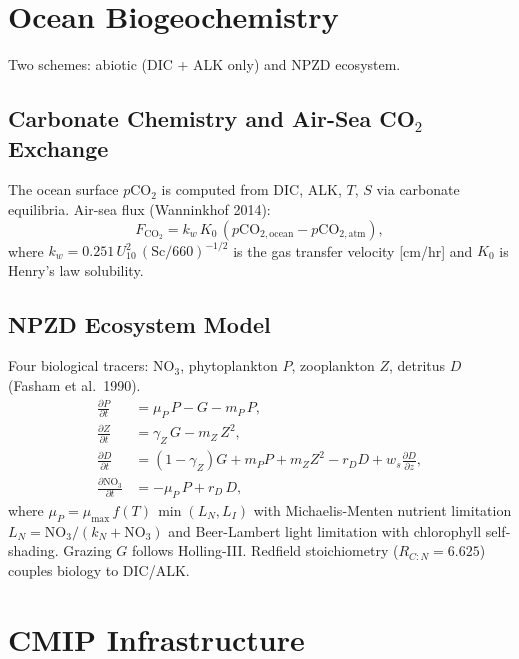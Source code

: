 \documentclass[11pt,a4paper]{article}
\newcommand{\pp}{\partial}
\begin{document}
\section{Ocean Biogeochemistry}

Two schemes: abiotic (DIC + ALK only) and NPZD ecosystem.

\subsection{Carbonate Chemistry and Air-Sea CO$_2$ Exchange}

The ocean surface $p$CO$_2$ is computed from DIC, ALK, $T$, $S$ via carbonate equilibria.
Air-sea flux (Wanninkhof 2014):
\begin{equation}
  F_{\mathrm{CO}_2} = k_w\,K_0\,(p\mathrm{CO}_{2,\mathrm{ocean}} - p\mathrm{CO}_{2,\mathrm{atm}}),
\end{equation}
where $k_w = 0.251\,U_{10}^2\,(\mathrm{Sc}/660)^{-1/2}$ is the gas transfer velocity [cm/hr] and $K_0$ is Henry's law solubility.

\subsection{NPZD Ecosystem Model}

Four biological tracers: NO$_3$, phytoplankton $P$, zooplankton $Z$, detritus $D$ (Fasham et al.\ 1990).
\begin{align}
  \frac{\pp P}{\pp t} &= \mu_P\,P - G - m_P\,P, \\
  \frac{\pp Z}{\pp t} &= \gamma_Z\,G - m_Z\,Z^2, \\
  \frac{\pp D}{\pp t} &= (1-\gamma_Z)G + m_P P + m_Z Z^2 - r_D D + w_s\frac{\pp D}{\pp z}, \\
  \frac{\pp \mathrm{NO}_3}{\pp t} &= -\mu_P\,P + r_D\,D,
\end{align}
where $\mu_P = \mu_{\max}\,f(T)\,\min(L_N,L_I)$ with Michaelis-Menten nutrient limitation $L_N=\mathrm{NO}_3/(k_N+\mathrm{NO}_3)$ and Beer-Lambert light limitation with chlorophyll self-shading.  Grazing $G$ follows Holling-III.  Redfield stoichiometry ($R_{C:N}=6.625$) couples biology to DIC/ALK.

\section{CMIP Infrastructure}
\end{document}
